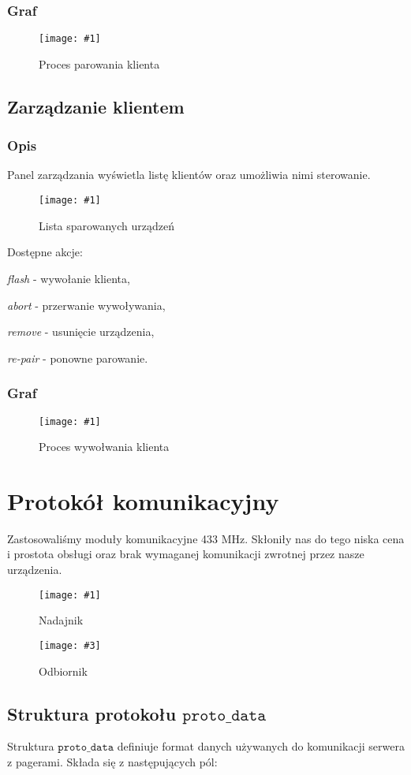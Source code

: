 \documentclass[12pt]{article}
\let\tempone\itemize
\let\temptwo\enditemize
\renewenvironment{itemize}{\tempone\setlength{\itemsep}{0cm}}{\temptwo}
\newcommand{\imgcustomsize}[3]{
	\begin{figure}[H]
		\centering
		\texttt{[image: \#1]}
		\caption{#2}
	\end{figure}
}
\newcommand{\img}[2]{\imgcustomsize{#1}{#2}{0.8}}
\newcommand{\imgsidebyside}[4]{
	\begin{figure}[H]
		\centering
		\begin{minipage}{.45\textwidth}
			\centering
			\texttt{[image: \#1]}
			\caption{#2}
		\end{minipage}%
		\hfill
		\begin{minipage}{.45\textwidth}
			\centering
			\texttt{[image: \#3]}
			\caption{#4}
		\end{minipage}
	\end{figure}
}
\begin{document}
        \subsubsection{Graf}
        \img{graphs/pairing}{Proces parowania klienta}

        \pagebreak
        \subsection{Zarządzanie klientem}
        \subsubsection{Opis}
        Panel zarządzania wyświetla listę klientów oraz umożliwia nimi sterowanie.
        \img{config/pagers_list}{Lista sparowanych urządzeń}
        Dostępne akcje:
        \begin{itemize}
            \item \emph{flash} - wywołanie klienta,
            \item \emph{abort} - przerwanie wywoływania,
            \item \emph{remove} - usunięcie urządzenia,
            \item \emph{re-pair} - ponowne parowanie.
        \end{itemize}
        \subsubsection{Graf}
        \img{graphs/flashing}{Proces wywołwania klienta}

    \pagebreak

    \section{Protokół komunikacyjny}
		Zastosowaliśmy moduły komunikacyjne 433 MHz. Skłoniły nas do tego niska cena i prostota obsługi oraz brak wymaganej komunikacji zwrotnej przez nasze urządzenia.

        \imgsidebyside{dev/tx}{Nadajnik}{dev/rx}{Odbiornik}

        \subsection{Struktura protokołu $\texttt{proto\_data}$}

        Struktura $\texttt{proto\_data}$ definiuje format danych używanych do komunikacji serwera z pagerami. Składa się z następujących pól:
\end{document}
